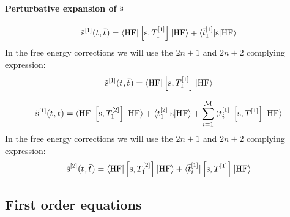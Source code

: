 \paragraph*{Perturbative expansion of $\tilde{\mathrm{s}}$}

\begin{equation}\label{eq:source-1st-order}
  \tilde{\mathrm{s}}^{[1]}(t_{}, \bar{t}_{}) =
  \braket{\mathrm{HF} | \left[ \mathrm{s}, T^{[1]}_1 \right]^{} | \mathrm{HF}}
  + \braket{\bar{t}_{1}^{[1]} | \mathrm{s} | \mathrm{HF}}
\end{equation}
In the free energy corrections we will use the $2n+1$ and $2n+2$ complying
expression:
\begin{equation}\label{eq:source-1st-order-rules}
  \tilde{\mathrm{s}}^{[1]}(t_{}, \bar{t}_{}) =
  \braket{\mathrm{HF} | \left[ \mathrm{s}, T^{[1]}_1 \right]^{} | \mathrm{HF}}
\end{equation}

\begin{equation}\label{eq:source-2nd-order}
  \tilde{\mathrm{s}}^{[1]}(t_{}, \bar{t}_{}) =
  \braket{\mathrm{HF} | \left[ \mathrm{s}, T^{[2]}_1 \right]^{} | \mathrm{HF}}
  + \braket{\bar{t}_{1}^{[2]} | \mathrm{s} | \mathrm{HF}}
  + \sum_{i=1}^{\mathcal{M}}\braket{\bar{t}_{i}^{[1]} | \left[ \mathrm{s}, T^{[1]} \right]^{} | \mathrm{HF}}
\end{equation}
In the free energy corrections we will use the $2n+1$ and $2n+2$ complying
expression:
\begin{equation}\label{eq:source-2nd-order-rules}
  \tilde{\mathrm{s}}^{[2]}(t_{}, \bar{t}_{}) =
  \braket{\mathrm{HF} | \left[ \mathrm{s}, T^{[2]}_1 \right]^{} | \mathrm{HF}}
  + \braket{\bar{t}_{i}^{[1]} | \left[ \mathrm{s}, T^{[1]} \right]^{} | \mathrm{HF}}
\end{equation}



\subsection{First order equations}\label{sec:first-order-pt}

